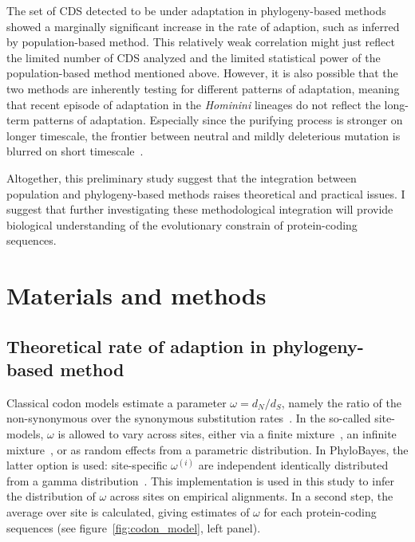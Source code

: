 \documentclass{article}
\begin{document}
The set of CDS detected to be under adaptation in phylogeny-based methods showed a marginally significant increase in the rate of adaption, such as inferred by population-based method.
This relatively weak correlation might just reflect the limited number of CDS analyzed and the limited statistical power of the population-based method mentioned above.
However, it is also possible that the two methods are inherently testing for different patterns of adaptation, meaning that recent episode of adaptation in the \textit{Hominini} lineages do not reflect the long-term patterns of adaptation.
Especially since the purifying process is stronger on longer timescale, the frontier between neutral and mildly deleterious mutation is blurred on short timescale~\citep{ho_time_2005}.

Altogether, this preliminary study suggest that the integration between population and phylogeny-based methods raises theoretical and practical issues.
I suggest that further investigating these methodological integration will provide biological understanding of the evolutionary constrain of protein-coding sequences.


\section*{Materials and methods}

\subsection*{Theoretical rate of adaption in phylogeny-based method }
Classical codon models estimate a parameter $\omega=d_N/d_S$, namely the ratio of the non-synonymous over the synonymous substitution rates~\citep{Muse1994,Goldman1994}.
In the so-called site-models, $\omega$ is allowed to vary across sites, either via a finite mixture~\citep{Yang2000}, an infinite mixture~\citep{Huelsenbeck2006}, or as random effects from a parametric distribution.
In PhyloBayes, the latter option is used: site-specific $\omega^{(i)}$ are independent identically distributed from a gamma distribution~\citep{Lartillot2013}.
This implementation is used in this study to infer the distribution of $\omega$ across sites on empirical alignments.
In a second step, the average over site is calculated, giving estimates of $\omega$ for each protein-coding sequences (see figure~\ref{fig:codon_model}, left panel).
\end{document}
